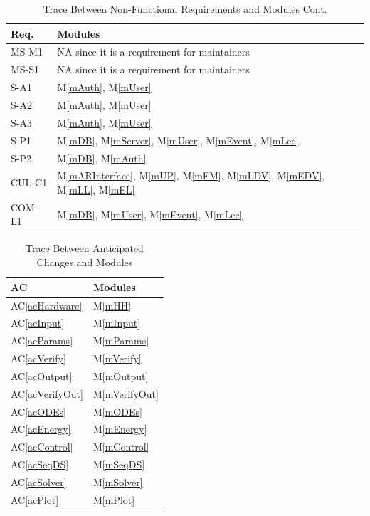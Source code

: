 \documentclass[12pt, titlepage]{article}
\newcommand{\acref}[1]{AC\ref{#1}}
\newcommand{\mref}[1]{M\ref{#1}}
\begin{document}
\begin{table}[H]
\centering
\begin{tabular}{p{} p{}}
\toprule
\textbf{Req.} & \textbf{Modules}\\
\midrule
MS-M1 & NA since it is a requirement for maintainers\\
MS-S1 & NA since it is a requirement for maintainers\\
S-A1 & \mref{mAuth}, \mref{mUser}\\
S-A2 & \mref{mAuth}, \mref{mUser}\\
S-A3 & \mref{mAuth}, \mref{mUser}\\
S-P1 & \mref{mDB}, \mref{mServer}, \mref{mUser}, \mref{mEvent}, \mref{mLec}\\
S-P2 & \mref{mDB}, \mref{mAuth}\\
CUL-C1 & \mref{mARInterface}, \mref{mUP}, \mref{mFM}, \mref{mLDV}, \mref{mEDV}, \mref{mLL}, \mref{mEL}\\
COM-L1 & \mref{mDB}, \mref{mUser}, \mref{mEvent}, \mref{mLec}\\
\bottomrule
\end{tabular}
\caption{Trace Between Non-Functional Requirements and Modules Cont.}
\label{TblNFRT-CONT}
\end{table}

\begin{table}[H]
\centering
\begin{tabular}{p{} p{}}
\toprule
\textbf{AC} & \textbf{Modules}\\
\midrule
\acref{acHardware} & \mref{mHH}\\
\acref{acInput} & \mref{mInput}\\
\acref{acParams} & \mref{mParams}\\
\acref{acVerify} & \mref{mVerify}\\
\acref{acOutput} & \mref{mOutput}\\
\acref{acVerifyOut} & \mref{mVerifyOut}\\
\acref{acODEs} & \mref{mODEs}\\
\acref{acEnergy} & \mref{mEnergy}\\
\acref{acControl} & \mref{mControl}\\
\acref{acSeqDS} & \mref{mSeqDS}\\
\acref{acSolver} & \mref{mSolver}\\
\acref{acPlot} & \mref{mPlot}\\
\bottomrule
\end{tabular}
\caption{Trace Between Anticipated Changes and Modules}
\label{TblACT}
\end{table}
\end{document}
